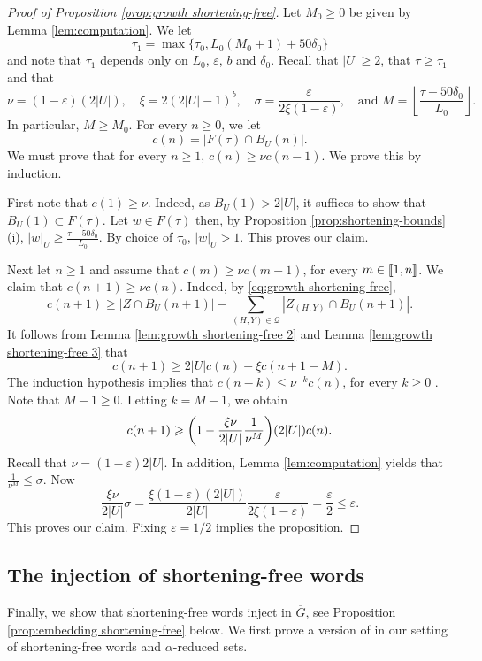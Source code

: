 \documentclass[leqno,a4paper,10pt]{amsart}
\theoremstyle{plain}
\theoremstyle{definition}
\theoremstyle{remark}
\newcommand{\scrQ}{\mathscr{Q}}
\let\le\leqslant
\let\ge\geqslant
\newcommand{\zinterval}[2]{
	\mathchoice%
	{\left \llbracket #1, \cdots, #2 \right \rrbracket}%
	{\llbracket #1, #2 \rrbracket}%
	{\llbracket #1, #2 \rrbracket}%
	{\llbracket #1, #2 \rrbracket}%
}
\begin{document}
\begin{proof}[Proof of Proposition \ref{prop:growth shortening-free}]
	Let $M_0\ge 0$ be given by Lemma \ref{lem:computation}. We let  
	$$\tau_1 = \max\{\tau_0,L_0(M_0+1)+50\delta_0\}$$
	and note that $\tau_1$ depends only on $L_0$, $\varepsilon$, $b$ and $\delta_0$. 
	Recall that $|U|\ge 2$, that $\tau\ge \tau_1$ and that
	$$\nu=(1-\varepsilon)(2|U|),\quad \xi=2(2|U|-1)^b,\quad\sigma=\frac{\varepsilon}{2\xi(1-\varepsilon)},\quad\text{and } M=\left\lfloor\frac{\tau-50\delta_0}{L_0}\right\rfloor.$$
	In particular, $M\ge M_0$. For every $n\ge 0$, we let
	$$c(n)=|F(\tau)\cap B_U(n)|.$$
	We must prove that for every $n\ge 1$, $c(n)\ge \nu c(n-1).$ 
We prove this by induction. 


	First note that $c(1)\ge \nu$. Indeed, as $B_U(1)>2|U|$, it suffices to show that $B_U(1)\subset F(\tau)$.  Let $w\in F(\tau)$ then, by  Proposition \ref{prop:shortening-bounds} (i), $|w|_U\ge \frac{\tau-50\delta_0}{L_0}$. By choice of $\tau_0$, $|w|_U>1$. This proves our claim.
	
Next let $n\ge 1$ and assume that $c(m)\ge \nu c(m-1)$, for every $m\in \zinterval{1}{n}$. We claim that $c(n+1)\ge \nu c(n)$. Indeed, by  \eqref{eq:growth shortening-free},
	$$c(n+1)\ge |Z\cap B_U(n+1)|-\sum_{(H,Y)\in\scrQ}|Z_{(H,Y)}\cap B_U(n+1)|.$$
	It follows from Lemma \ref{lem:growth shortening-free 2} and Lemma \ref{lem:growth shortening-free 3} that
	$$c(n+1)\ge 2|U|c(n)-\xi c(n+1-M).$$
	The induction hypothesis implies that $c(n-k)\le \nu^{-k}c(n)$, for every $k\ge 0$ . Note that $M-1\ge 0$. Letting $k=M-1$, we obtain
	$$c(n+1)\ge\qty(1-\frac{\xi\nu}{2|U|}\frac{1}{\nu^{M}})(2|U|)c(n).$$
	Recall that $\nu=(1-\varepsilon)2|U|$. In addition, Lemma \ref{lem:computation} yields that $\frac{1}{\nu^{M}}\le \sigma.$
Now
	$$\frac{\xi\nu}{2|U|}\sigma=\frac{\xi(1-\varepsilon)(2|U|)}{2|U|}\frac{\varepsilon}{2\xi(1-\varepsilon)}=\frac{\varepsilon}{2}\le \varepsilon.$$
	This proves our claim. Fixing $\varepsilon=1/2$ implies the proposition.
\end{proof}

\subsection{The injection of shortening-free words}
\label{subsec:embedding}
Finally, we show that shortening-free words inject in $\overline{G}$, see Proposition \ref{prop:embedding shortening-free} below. We first prove a version of \cite[Proposition 4.2]{coulon_product_2022} in our setting of shortening-free words and $\alpha$-reduced sets. 
\end{document}
